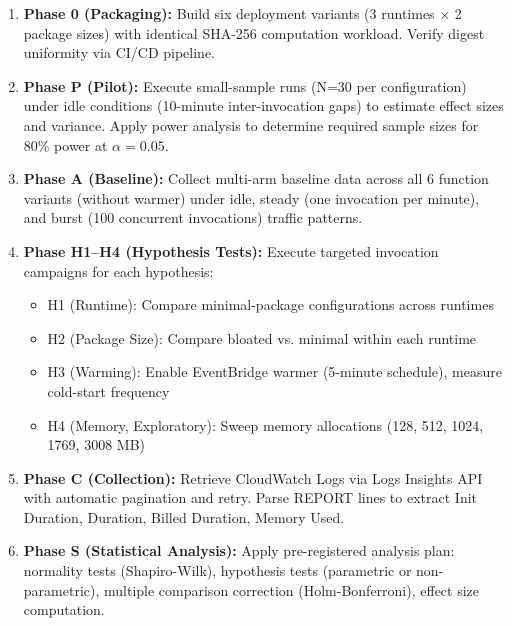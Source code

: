 \begin{enumerate}
    \item \textbf{Phase 0 (Packaging):} Build six deployment variants (3 runtimes × 2 package sizes) with identical SHA-256 computation workload. Verify digest uniformity via CI/CD pipeline.
    
    \item \textbf{Phase P (Pilot):} Execute small-sample runs (N=30 per configuration) under idle conditions (10-minute inter-invocation gaps) to estimate effect sizes and variance. Apply power analysis to determine required sample sizes for 80\% power at $\alpha = 0.05$.
    
    \item \textbf{Phase A (Baseline):} Collect multi-arm baseline data across all 6 function variants (without warmer) under idle, steady (one invocation per minute), and burst (100 concurrent invocations) traffic patterns.
    
    \item \textbf{Phase H1–H4 (Hypothesis Tests):} Execute targeted invocation campaigns for each hypothesis:
    \begin{itemize}
        \item H1 (Runtime): Compare minimal-package configurations across runtimes
        \item H2 (Package Size): Compare bloated vs. minimal within each runtime
        \item H3 (Warming): Enable EventBridge warmer (5-minute schedule), measure cold-start frequency
        \item H4 (Memory, Exploratory): Sweep memory allocations (128, 512, 1024, 1769, 3008 MB)
    \end{itemize}
    
    \item \textbf{Phase C (Collection):} Retrieve CloudWatch Logs via Logs Insights API with automatic pagination and retry. Parse REPORT lines to extract Init Duration, Duration, Billed Duration, Memory Used.
    
    \item \textbf{Phase S (Statistical Analysis):} Apply pre-registered analysis plan: normality tests (Shapiro-Wilk), hypothesis tests (parametric or non-parametric), multiple comparison correction (Holm-Bonferroni), effect size computation.
\end{enumerate}


